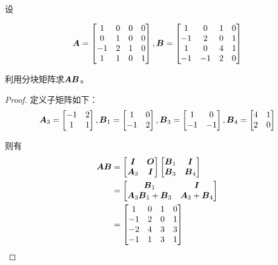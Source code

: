 \begin{problem}
设

\begin{equation*}
    \boldsymbol{A}=\begin{bmatrix}1&0&0&0\\0&1&0&0\\-1&2&1&0\\1&1&0&1\end{bmatrix},
    \boldsymbol{B}=\begin{bmatrix}1&0&1&0\\-1&2&0&1\\1&0&4&1\\-1&-1&2&0\end{bmatrix}
\end{equation*}

利用分块矩阵求\(\boldsymbol{A}\boldsymbol{B}\)。
\end{problem}
\begin{proof}
    定义子矩阵如下：
    \begin{equation*}
        \boldsymbol{A}_3=
        \begin{bmatrix}
            -1 & 2 \\1&1
        \end{bmatrix},
        \boldsymbol{B}_1=
        \begin{bmatrix}
            1 & 0 \\-1&2
        \end{bmatrix},
        \boldsymbol{B}_3=
        \begin{bmatrix}
            1 & 0 \\-1&-1
        \end{bmatrix},
        \boldsymbol{B}_4=
        \begin{bmatrix}
            4 & 1 \\2&0
        \end{bmatrix}
    \end{equation*}

    则有
    \begin{align*}
        \boldsymbol{A}\boldsymbol{B} & =
        \begin{bmatrix}
            \boldsymbol{I} & \boldsymbol{O} \\\boldsymbol{A}_3&\boldsymbol{I}
        \end{bmatrix}
        \begin{bmatrix}
            \boldsymbol{B}_1 & \boldsymbol{I} \\\boldsymbol{B}_3&\boldsymbol{B}_4
        \end{bmatrix}                        \\&=
        \begin{bmatrix}
            \boldsymbol{B}_1 & \boldsymbol{I} \\\boldsymbol{A}_3\boldsymbol{B}_1+\boldsymbol{B}_3&\boldsymbol{A}_3+\boldsymbol{B}_4
        \end{bmatrix} \\&=
        \begin{bmatrix}
            1  & 0 & 1 & 0 \\
            -1 & 2 & 0 & 1 \\
            -2 & 4 & 3 & 3 \\
            -1 & 1 & 3 & 1
        \end{bmatrix}
    \end{align*}
\end{proof}

